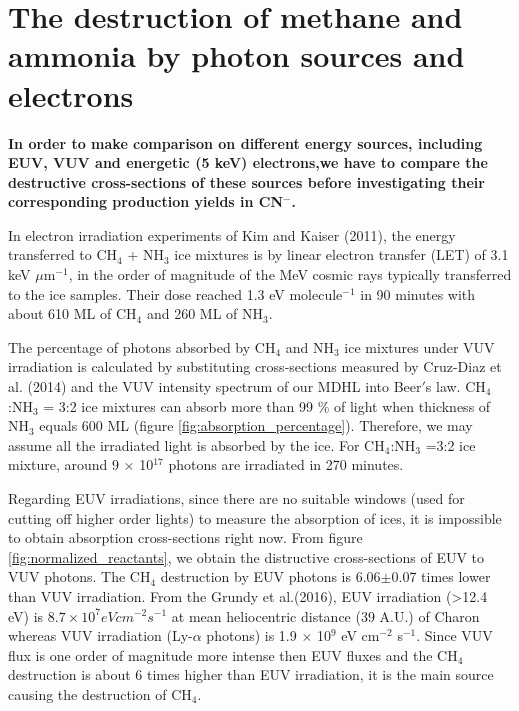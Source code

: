 \section{The destruction of methane and ammonia by photon sources and electrons}

\textbf{In order to make comparison on different energy sources, including EUV, VUV and energetic (5 keV) electrons,we have to compare the destructive cross-sections of these sources before investigating their corresponding production yields in CN$^-$.}

In electron irradiation experiments of Kim and Kaiser (2011)\cite{kim}, the energy transferred to CH$_4$ + NH$_3$ ice mixtures is by linear electron transfer (LET) of 3.1 keV $\mu$m$^{-1}$, in the order of magnitude of the MeV cosmic rays typically transferred to the ice samples. Their dose reached 1.3 eV molecule$^{-1}$ in 90 minutes with about 610 ML of CH$_4$ and 260 ML of NH$_3$. 

The percentage of photons absorbed by CH$_4$ and NH$_3$ ice mixtures under VUV irradiation is calculated by substituting cross-sections measured by Cruz-Diaz et al. (2014) \cite{cruz2014vacuum} and the VUV intensity spectrum of our MDHL into Beer$'$s law. CH$_4$:NH$_3$ = 3:2 ice mixtures can absorb more than 99 \% of light when thickness of NH$_3$ equals 600 ML (figure \ref{fig:absorption_percentage}). Therefore, we may assume all the irradiated light is absorbed by the ice. For CH$_4$:NH$_3$ =3:2 ice mixture, around 9 $\times$ 10$^{17}$ photons are irradiated in 270 minutes.

Regarding EUV irradiations, since there are no suitable windows (used for cutting off higher order lights) to measure the absorption of ices, it is impossible to obtain absorption cross-sections right now. From figure \ref{fig:normalized_reactants}, we obtain the distructive cross-sections of EUV to VUV photons. The CH$_4$ destruction by EUV photons is 6.06$\pm$0.07 times lower than VUV irradiation.  From the Grundy et al.(2016)\cite{grundy2016formation}, EUV irradiation (>12.4 eV) is $8.7 \times 10^7 eV cm^{-2} s^{-1}$ at mean heliocentric distance (39 A.U.) of Charon whereas VUV irradiation (Ly-$\alpha$ photons) is 1.9 $\times$ 10$^9$ eV cm$^{-2}$ s$^{-1}$. Since VUV flux is one order of magnitude more intense then EUV fluxes and the CH$_4$ destruction is about 6 times higher than EUV irradiation, it is the main source causing the destruction of CH$_4$.

